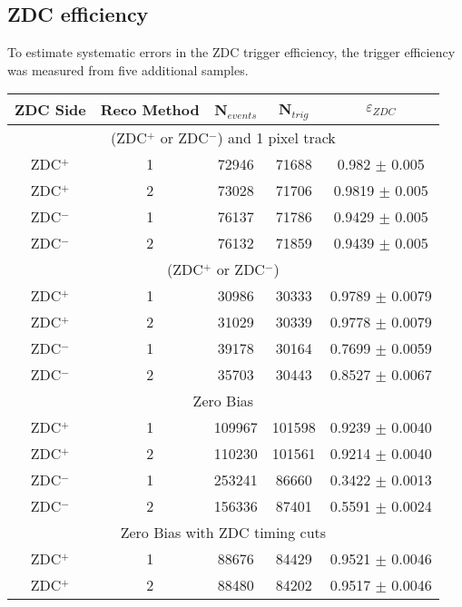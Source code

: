     \subsection{ZDC efficiency}
      To estimate systematic errors in the ZDC trigger efficiency, the trigger
        efficiency was measured from five additional samples. 
      \begin{table}
        \centering
        \begin{tabular}{|c|c|c|c|c|}
          \hline ZDC Side & Reco Method & N$_{events}$ & N$_{trig}$ & $\varepsilon_{ZDC}$ \\ \hline
           \multicolumn{5}{|c|}{(ZDC$^{+}$ or ZDC$^{-}$) and 1 pixel track} \\ \hline 
           ZDC$^{+}$ & 1 & 72946  & 71688 & 0.982 $\pm$ 0.005 \\ \hline
           ZDC$^{+}$ & 2 & 73028  & 71706  & 0.9819  $\pm$ 0.005  \\ \hline
           ZDC$^{-}$ & 1 & 76137  & 71786  & 0.9429  $\pm$ 0.005  \\ \hline
           ZDC$^{-}$ & 2 & 76132  & 71859  & 0.9439  $\pm$ 0.005  \\ \hline
           \multicolumn{5}{|c|}{(ZDC$^{+}$ or ZDC$^{-}$)} \\ \hline 
           ZDC$^{+}$ & 1 & 30986 & 30333 & 0.9789 $\pm$ 0.0079 \\ \hline
           ZDC$^{+}$ & 2 & 31029 & 30339 & 0.9778 $\pm$ 0.0079 \\ \hline
           ZDC$^{-}$ & 1 & 39178 & 30164 & 0.7699 $\pm$ 0.0059 \\ \hline
           ZDC$^{-}$ & 2 & 35703 & 30443 & 0.8527 $\pm$ 0.0067 \\ \hline
           \multicolumn{5}{|c|}{ Zero Bias} \\ \hline 
           ZDC$^{+}$ & 1 & 109967  & 101598  & 0.9239 $\pm$ 0.0040 \\ \hline
           ZDC$^{+}$ & 2 & 110230  & 101561  & 0.9214 $\pm$ 0.0040 \\ \hline
           ZDC$^{-}$ & 1 & 253241  & 86660  & 0.3422 $\pm$ 0.0013 \\ \hline
           ZDC$^{-}$ & 2 & 156336  & 87401  & 0.5591 $\pm$ 0.0024 \\ \hline
           \multicolumn{5}{|c|}{ Zero Bias with ZDC timing cuts} \\ \hline 
           ZDC$^{+}$ & 1 & 88676  & 84429  & 0.9521 $\pm$ 0.0046 \\ \hline
           ZDC$^{+}$ & 2 & 88480  & 84202  & 0.9517 $\pm$ 0.0046 \\ \hline

\end{tabular}
\end{table}
